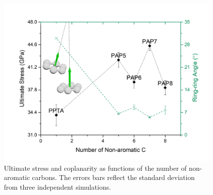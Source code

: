 \documentclass[journal=langd5,manuscript=article]{achemso}
\begin{document}


\begin{figure}[h!]
\centering
\includegraphics[scale=0.60]{Coplanarity.png}
\caption{Ultimate stress and coplanarity as functions of the number of non-aromatic carbons. The errors bars reflect the standard deviation from three independent simulations.}
\label{fig:Coplanarity} 
\end{figure}



\FloatBarrier
\end{document}
